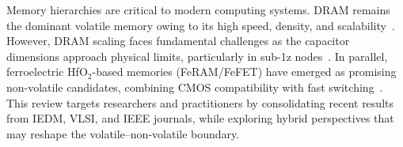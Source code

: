 Memory hierarchies are critical to modern computing systems. 
DRAM remains the dominant volatile memory owing to its high speed, density, and scalability~\cite{choi2022, kim2021_dram}. 
However, DRAM scaling faces fundamental challenges as the capacitor dimensions approach physical limits, particularly in sub-1z nodes~\cite{lee2020_dram, iedm2023_dram}. 
In parallel, ferroelectric HfO$_2$-based memories (FeRAM/FeFET) have emerged as promising non-volatile candidates, combining CMOS compatibility with fast switching~\cite{boscke2011, mueller2012}. 
This review targets researchers and practitioners by consolidating recent results from IEDM, VLSI, and IEEE journals, while exploring hybrid perspectives that may reshape the volatile–non-volatile boundary.

